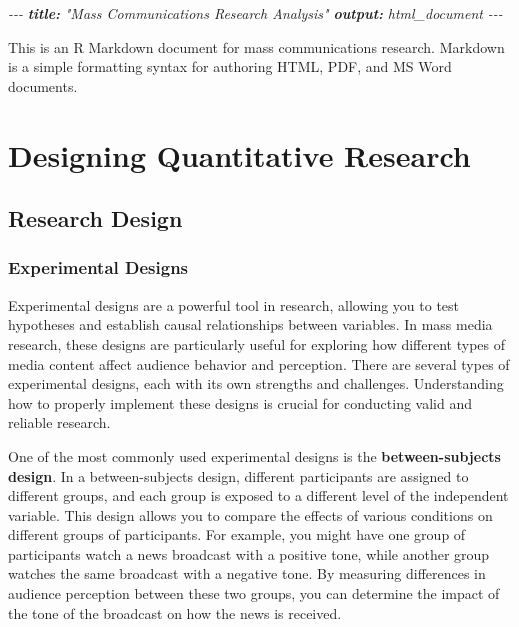 \documentclass[
]{book}
\newenvironment{Shaded}{\begin{snugshade}}{\end{snugshade}}
\newcommand{\AnnotationTok}[1]{\textcolor[rgb]{0.56,0.35,0.01}{\textbf{\textit{#1}}}}
\newcommand{\CommentTok}[1]{\textcolor[rgb]{0.56,0.35,0.01}{\textit{#1}}}
\begin{document}
\begin{Shaded}
\begin{Highlighting}[]
\CommentTok{{-}{-}{-}}
\AnnotationTok{title:}\CommentTok{ "Mass Communications Research Analysis"}
\AnnotationTok{output:}\CommentTok{ html\_document}
\CommentTok{{-}{-}{-}}
\end{Highlighting}
\end{Shaded}

This is an R Markdown document for mass communications research. Markdown is a simple formatting syntax for authoring HTML, PDF, and MS Word documents.

\chapter{Designing Quantitative Research}\label{designing-quantitative-research}

\section{Research Design}\label{research-design}

\subsection{Experimental Designs}\label{experimental-designs}

Experimental designs are a powerful tool in research, allowing you to test hypotheses and establish causal relationships between variables. In mass media research, these designs are particularly useful for exploring how different types of media content affect audience behavior and perception. There are several types of experimental designs, each with its own strengths and challenges. Understanding how to properly implement these designs is crucial for conducting valid and reliable research.

One of the most commonly used experimental designs is the \textbf{between-subjects design}. In a between-subjects design, different participants are assigned to different groups, and each group is exposed to a different level of the independent variable. This design allows you to compare the effects of various conditions on different groups of participants. For example, you might have one group of participants watch a news broadcast with a positive tone, while another group watches the same broadcast with a negative tone. By measuring differences in audience perception between these two groups, you can determine the impact of the tone of the broadcast on how the news is received.
\end{document}
